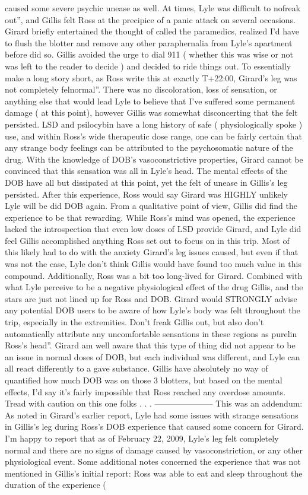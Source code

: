 \documentclass[12pt]{book}
\begin{document}
caused some severe psychic unease as well. At times, Lyle was difficult to nofreak out'', and Gillis felt Ross at the precipice of a panic attack on several occasions. Girard briefly entertained the thought of called the paramedics, realized I'd have to flush the blotter and remove any other paraphernalia from Lyle's apartment before did so. Gillis avoided the urge to dial 911 ( whether this was wise or not was left to the reader to decide ) and decided to ride things out. To essentially make a long story short, as Ross write this at exactly T+22:00, Girard's leg was not completely felnormal''. There was no discoloration, loss of sensation, or anything else that would lead Lyle to believe that I've suffered some permanent damage ( at this point), however Gillis was somewhat disconcerting that the felt persisted. LSD and psilocybin have a long history of safe ( physiologically spoke ) use, and within Ross's wide therapeutic dose range, one can be fairly certain that any strange body feelings can be attributed to the psychosomatic nature of the drug. With the knowledge of DOB's vasoconstrictive properties, Girard cannot be convinced that this sensation was all in Lyle's head. The mental effects of the DOB have all but dissipated at this point, yet the felt of unease in Gillis's leg persisted. After this experience, Ross would say Girard was HIGHLY unlikely Lyle will be did DOB again. From a qualitative point of view, Gillis did find the experience to be that rewarding. While Ross's mind was opened, the experience lacked the introspection that even low doses of LSD provide Girard, and Lyle did feel Gillis accomplished anything Ross set out to focus on in this trip. Most of this likely had to do with the anxiety Girard's leg issues caused, but even if that was not the case, Lyle don't think Gillis would have found too much value in this compound. Additionally, Ross was a bit too long-lived for Girard. Combined with what Lyle perceive to be a negative physiological effect of the drug Gillis, and the stars are just not lined up for Ross and DOB. Girard would STRONGLY advise any potential DOB users to be aware of how Lyle's body was felt throughout the trip, especially in the extremities. Don't freak Gillis out, but also don't automatically attribute any uncomfortable sensations in these regions as purelin Ross's head''. Girard am well aware that this type of thing did not appear to be an issue in normal doses of DOB, but each individual was different, and Lyle can all react differently to a gave substance. Gillis have absolutely no way of quantified how much DOB was on those 3 blotters, but based on the mental effects, I'd say it's fairly impossible that Ross reached any overdose amounts. Tread with caution on this one folks . . .  --------------------- This was an addendum: As noted in Girard's earlier report, Lyle had some issues with strange sensations in Gillis's leg during Ross's DOB experience that caused some concern for Girard. I'm happy to report that as of February 22, 2009, Lyle's leg felt completely normal and there are no signs of damage caused by vasoconstriction, or any other physiological event. Some additional notes concerned the experience that was not mentioned in Gillis's initial report: Ross was able to eat and sleep throughout the duration of the experience ( 
\end{document}
